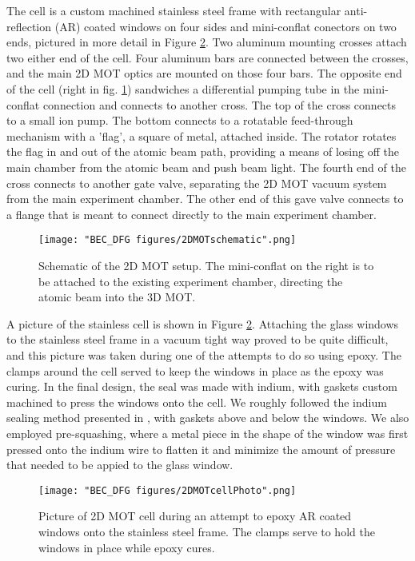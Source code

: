 The cell is a custom machined stainless steel frame with rectangular anti-reflection (AR) coated windows on four sides and mini-conflat conectors on two ends, pictured in more detail in Figure \ref{fig:2DMOTcellPhoto}. Two aluminum mounting crosses attach two either end of the cell. Four aluminum bars are connected between the crosses, and the main 2D MOT optics are mounted on those four bars. The opposite end of the cell (right in fig. \ref{fig:2DMOTschematic}) sandwiches a differential pumping tube in the mini-conflat connection and connects to another cross. The top of the cross connects to a small ion pump. The bottom connects to a rotatable feed-through mechanism with a 'flag', a square of metal, attached inside. The rotator rotates the flag in and out of the atomic beam path, providing a means of losing off the main chamber from the atomic beam and push beam light. The fourth end of the cross connects to another gate valve, separating the 2D MOT vacuum system from the main experiment chamber. The other end of this gave valve connects to a flange that is meant to connect directly to the main experiment chamber.  


\begin{figure}
	\texttt{[image: "BEC\_DFG figures/2DMOTschematic".png]}
\caption{Schematic of the 2D MOT setup. The mini-conflat on the right is to be attached to the existing experiment chamber, directing the atomic beam into the 3D MOT. }
\label{fig:2DMOTschematic}
\end{figure}

A picture of the stainless cell is shown in Figure \ref{fig:2DMOTcellPhoto}. Attaching the glass windows to the stainless steel frame in a vacuum tight way proved to be quite difficult, and this picture was taken during one of the attempts to do so using epoxy. The clamps around the cell served to keep the windows in place as the epoxy was curing. In the final design, the seal was made with indium, with gaskets custom machined to press the windows onto the cell. We roughly followed the indium sealing method presented in \cite{Weatherill2009}, with gaskets above and below the windows. We also employed pre-squashing, where a metal piece in the shape of the window was first pressed onto the indium wire to flatten it and minimize the amount of pressure that needed to be appied to the glass window.  
\begin{figure}
	\texttt{[image: "BEC\_DFG figures/2DMOTcellPhoto".png]}
\caption{Picture of 2D MOT cell during an attempt to epoxy AR coated windows onto the stainless steel frame. The clamps serve to hold the windows in place while epoxy cures.}
\label{fig:2DMOTcellPhoto}
\end{figure}

